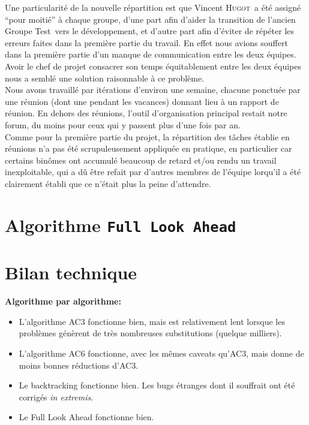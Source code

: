 \documentclass[a4paper,12pt]{article}
\def\familyname{\textsc}
\def\firstname#1{#1}
\def\groupmember#1#2{\firstname{#1} \familyname{#2}}
\def\mvin{\groupmember{Vincent}{Hugot}}
\def\grpt{Groupe Test}
\newcommand\seclvlA{
\newcommand\SA\section
\newcommand\SB\subsection
\newcommand\SC\subsubsection}
\begin{document}
\noi Une particularité de la nouvelle répartition est que \mvin\ a
été assigné ``pour moitié'' à chaque groupe, d'une part
afin d'aider la transition de l'ancien \grpt\ vers le développement,
et d'autre part afin d'éviter de répéter les erreurs faites dans la première
partie du travail. En effet nous avions souffert dans la première partie
d'un manque de communication entre les deux équipes.
Avoir le chef de projet consacrer son temps équitablement
entre les deux équipes nous a semblé une solution raisonnable
à ce problème.\mk\\
%
Nous avons travaillé par itérations d'environ une semaine,
chacune ponctuée par une réunion (dont une pendant les vacances)
donnant lieu à un rapport de réunion.
En dehors des réunions, l'outil d'organisation
principal restait notre forum, du moins pour ceux
qui y passent plus d'une fois par an.\mk\\
%
Comme pour la première partie du projet, la répartition
des tâches établie en réunions n'a pas été scrupuleusement
appliquée en pratique, 
en particulier car certains binômes ont
accumulé beaucoup de retard et/ou rendu
un travail inexploitable, qui a dû être refait par 
d'autres membres de l'équipe lorqu'il a été clairement
établi que ce n'était plus la peine d'attendre.


\section{Algorithme \texttt{Full Look Ahead}}

\seclvlA






\section{Bilan technique}

\textbf{Algorithme par algorithme:}
\begin{itemize}
\item L'algorithme AC3 fonctionne bien, mais est relativement lent lorsque les problèmes 
génèrent de très nombreuses substitutions (quelque milliers).

\item L'algorithme AC6 fonctionne, avec les mêmes caveats qu'AC3, mais donne de moins bonnes
réductions d'AC3.

\item Le backtracking fonctionne bien. Les bugs étranges dont il souffrait
    ont été corrigés \emph{in extremis}.

\item Le Full Look Ahead fonctionne bien.
  
\end{itemize}
\end{document}
